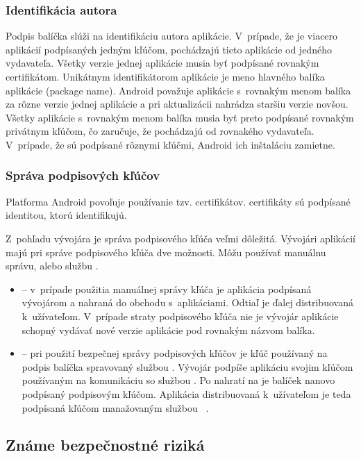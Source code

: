 \subsubsection{\textbf{Identifikácia autora}}
Podpis balíčka slúži na identifikáciu autora aplikácie. V~prípade, že je viacero aplikácií podpísaných jedným kľúčom, pochádzajú tieto aplikácie od jedného vydavateľa. 
Všetky verzie jednej aplikácie musia byť podpísané rovnakým certifikátom. Unikátnym identifikátorom aplikácie je meno hlavného balíka aplikácie (package name). Android považuje aplikácie s~rovnakým menom balíka za rôzne verzie jednej aplikácie a pri aktualizácii nahrádza staršiu verzie novšou. Všetky aplikácie s~rovnakým menom balíka musia byť preto podpísané rovnakým privátnym kľúčom, čo zaručuje, že pochádzajú od rovnakého vydavateľa.  V~prípade, že sú podpísané rôznymi kľúčmi, Android ich inštaláciu zamietne. 

\subsubsection{\textbf{Správa podpisových kľúčov}}
Platforma Android povoľuje používanie tzv.  certifikátov.  certifikáty sú podpísané identitou, ktorú identifikujú. 

Z~pohľadu vývojára je správa podpisového kľúča veľmi dôležitá. Vývojári aplikácií majú pri správe podpisového kľúča dve možnosti. Môžu používať manuálnu správu, alebo službu . 
\begin{itemize}
	\item {} -- v~prípade použitia manuálnej správy kľúča je aplikácia podpísaná vývojárom a nahraná do obchodu s~aplikáciami. Odtiaľ je ďalej distribuovaná k~užívateľom. V~prípade straty podpisového kľúča nie je vývojár aplikácie schopný vydávať nové verzie aplikácie pod rovnakým názvom balíka.
	\item {} -- pri použití bezpečnej správy podpisových kľúčov  je kľúč používaný na podpis balíčka spravovaný službou  . Vývojár podpíše aplikáciu svojim kľúčom používaným na komunikáciu so službou  . Po nahratí na  je balíček nanovo podpísaný podpisovým kľúčom. Aplikácia distribuovaná k~užívateľom je teda podpísaná kľúčom manažovaným službou ~\cite{NT0FrzQIkOAYbG2G}. 
\end{itemize}


\subsection{Známe bezpečnostné riziká}

